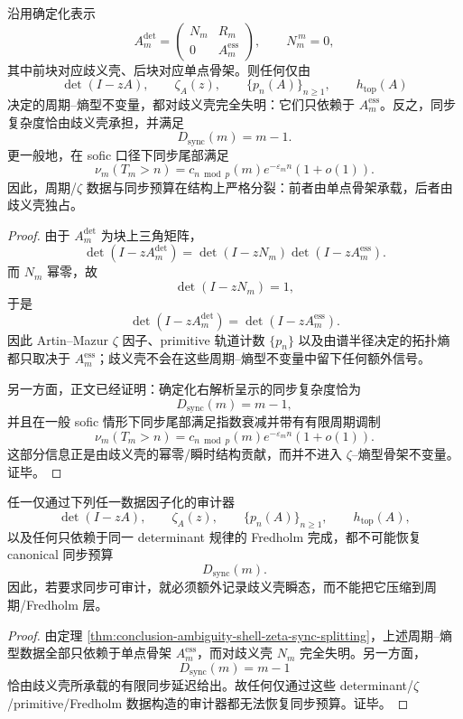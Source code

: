 \begin{theorem}\label{thm:conclusion-ambiguity-shell-zeta-sync-splitting}
沿用确定化表示
\[
A_m^{\mathrm{det}}
=
\begin{pmatrix}
N_m & R_m\\
0 & A_m^{\mathrm{ess}}
\end{pmatrix},
\qquad
N_m^{\,m}=0,
\]
其中前块对应歧义壳、后块对应单点骨架。则任何仅由
\[
\det(I-zA),\qquad \zeta_A(z),\qquad \{p_n(A)\}_{n\ge1},\qquad h_{\mathrm{top}}(A)
\]
决定的周期--熵型不变量，都对歧义壳完全失明：它们只依赖于 \(A_m^{\mathrm{ess}}\)。反之，同步复杂度恰由歧义壳承担，并满足
\[
\boxed{\;D_{\mathrm{sync}}(m)=m-1.\;}
\]
更一般地，在 sofic 口径下同步尾部满足
\[
\nu_m(T_m>n)=c_{n\bmod p}(m)e^{-\varepsilon_m n}(1+o(1)).
\]
因此，周期/\(\zeta\) 数据与同步预算在结构上严格分裂：前者由单点骨架承载，后者由歧义壳独占。
\end{theorem}
\begin{proof}
由于 \(A_m^{\mathrm{det}}\) 为块上三角矩阵，
\[
\det(I-zA_m^{\mathrm{det}})
=
\det(I-zN_m)\det(I-zA_m^{\mathrm{ess}}).
\]
而 \(N_m\) 幂零，故
\[
\det(I-zN_m)=1,
\]
于是
\[
\det(I-zA_m^{\mathrm{det}})=\det(I-zA_m^{\mathrm{ess}}).
\]
因此 Artin--Mazur \(\zeta\) 因子、primitive 轨道计数 \(\{p_n\}\) 以及由谱半径决定的拓扑熵都只取决于 \(A_m^{\mathrm{ess}}\)；歧义壳不会在这些周期--熵型不变量中留下任何额外信号。

另一方面，正文已经证明：确定化右解析呈示的同步复杂度恰为
\[
D_{\mathrm{sync}}(m)=m-1,
\]
并且在一般 sofic 情形下同步尾部满足指数衰减并带有有限周期调制
\[
\nu_m(T_m>n)=c_{n\bmod p}(m)e^{-\varepsilon_m n}(1+o(1)).
\]
这部分信息正是由歧义壳的幂零/瞬时结构贡献，而并不进入 \(\zeta\)--熵型骨架不变量。证毕。
\end{proof}

\begin{corollary}\label{cor:conclusion-periodic-fredholm-strict-sync-blindness}
任一仅通过下列任一数据因子化的审计器
\[
\det(I-zA),\qquad
\zeta_A(z),\qquad
\{p_n(A)\}_{n\ge1},\qquad
h_{\mathrm{top}}(A),
\]
以及任何只依赖于同一 determinant 规律的 Fredholm 完成，都不可能恢复 canonical 同步预算
\[
D_{\mathrm{sync}}(m).
\]
因此，若要求同步可审计，就必须额外记录歧义壳瞬态，而不能把它压缩到周期/Fredholm 层。
\end{corollary}
\begin{proof}
由定理 \ref{thm:conclusion-ambiguity-shell-zeta-sync-splitting}，上述周期--熵型数据全部只依赖于单点骨架 \(A_m^{\mathrm{ess}}\)，而对歧义壳 \(N_m\) 完全失明。另一方面，
\[
D_{\mathrm{sync}}(m)=m-1
\]
恰由歧义壳所承载的有限同步延迟给出。故任何仅通过这些 determinant/\(\zeta\)/primitive/Fredholm 数据构造的审计器都无法恢复同步预算。证毕。
\end{proof}

